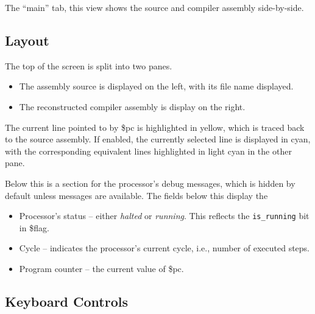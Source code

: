\documentclass[10pt]{article}
\begin{document}
    The ``main'' tab, this view shows the source and compiler assembly side-by-side.

    \subsection{Layout}

    The top of the screen is split into two panes.
    \begin{itemize}
        \item The assembly source is displayed on the left, with its file name displayed.
        \item The reconstructed compiler assembly is display on the right.
    \end{itemize}
    The current line pointed to by \$pc is highlighted in yellow, which is traced back to the source assembly.
    If enabled, the currently selected line is displayed in cyan, with the corresponding equivalent lines highlighted in light cyan in the other pane.

    Below this is a section for the processor's debug messages, which is hidden by default unless messages are available.
    The fields below this display the
    \begin{itemize}
        \item Processor's status -- either \textit{halted} or \textit{running}.
        This reflects the \texttt{is\_running} bit in \$flag.
        \item Cycle -- indicates the processor's current cycle, i.e., number of executed steps.
        \item Program counter -- the current value of \$pc.
    \end{itemize}

    \subsection{Keyboard Controls}
\end{document}
